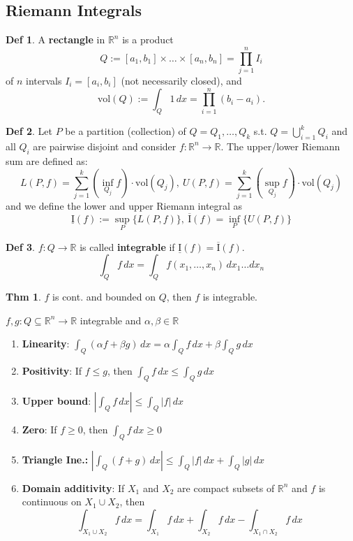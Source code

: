 \documentclass[a4paper, 10pt]{article}
\theoremstyle{definition}
\newtheorem*{theorem}{Thm}
\newtheorem*{definition}{Def}
\newcommand{\R}{\mathbb{R}}
\begin{document}
\subsection{Riemann Integrals}
\begin{definition}
    A \textbf{rectangle} in \(\R^n\) is a product
    \[Q := [a_1, b_1] \times \ldots \times [a_n, b_n] = \prod_{j=1}^n I_i\]
    of \(n\) intervals \(I_i = [a_i, b_i]\) (not necessarily closed), and
    \[\text{vol}(Q) := \int_Q 1 \,dx = \prod_{i=1}^n (b_i - a_i).\]
\end{definition}

\begin{definition}
    Let \(P\) be a partition (collection) of \(Q = Q_1, \ldots, Q_k\) s.t. \(Q = \bigcup_{i=1}^k Q_i\) and all \(Q_i\) are pairwise disjoint and consider \(f: \R^n \to \R\).
    The upper/lower Riemann sum are defined as:
    \[L(P, f) = \sum_{j = 1}^k (\inf_{Q_j} f) \cdot \text{vol}(Q_j), \ U(P, f) = \sum_{j = 1}^k (\sup_{Q_j} f) \cdot \text{vol}(Q_j)\]
    and we define the lower and upper Riemann integral as
    \[\underline{\text{I}}(f) := \sup_P \{L(P, f)\}, \ \overline{\text{I}}(f) = \inf_P \{U(P, f)\}\]
\end{definition}

\begin{definition}
    \(f: Q \to \R\) is called \textbf{integrable} if \(\underline{\text{I}}(f) = \overline{\text{I}}(f)\).
    \[\int_Q f \,dx = \int_Q f(x_1, \ldots, x_n) \, dx_1 \ldots dx_n\]
\end{definition}

\begin{theorem}
    \(f\) is cont. and bounded on \(Q\), then \(f\) is integrable.
\end{theorem}

\begin{ntheorem*}[Properties] \(f,g : Q \subseteq \R^n \to \R\) integrable and \(\alpha, \beta \in \R\)
    \begin{enumerate}[leftmargin=15pt]
        \item \textbf{Linearity}: \(\int_Q(\alpha f + \beta g) \, dx = \alpha \int_Q f \, dx + \beta \int_Q g \,dx\)
        \item \textbf{Positivity}: If \(f \leq g\), then \(\int_Q f \, dx \leq \int_Q g \, dx\)
        \item \textbf{Upper bound}: \(| \int_Q f \, dx | \leq \int_Q |f| \, dx\)
        \item \textbf{Zero}: If \(f \geq 0\), then \(\int_Q f \, dx \geq 0\)
        \item \textbf{Triangle Ine.:} \(| \int_Q (f + g) \, dx | \leq \int_Q |f| \, dx + \int_Q |g| \, dx\)
        \item \textbf{Domain additivity}: If \(X_1\) and \(X_2\) are compact subsets of \(\R^n\) and \(f\) is continuous on \(X_1 \cup X_2\), then
        \[\int_{X_1 \cup X_2} f \, dx = \int_{X_1} f \, dx + \int_{X_2} f \, dx - \int_{X_1 \cap X_2} f \, dx\]
    \end{enumerate}
\end{ntheorem*}
\end{document}
